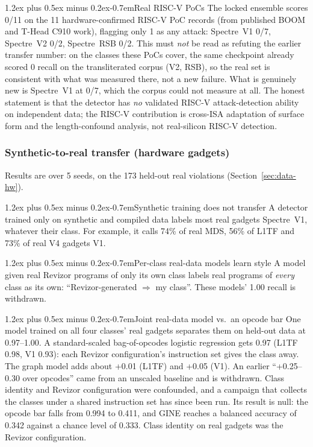 \documentclass[conference]{IEEEtran}
\makeatletter
\renewcommand\paragraph{\@startsection{paragraph}{4}{\z@}%
  {1.2ex plus 0.5ex minus 0.2ex}{-0.7em}{\normalfont\normalsize\bfseries}}
\makeatother
\begin{document}
\paragraph{Real RISC-V PoCs}
The locked ensemble scores 0/11 on the 11 hardware-confirmed RISC-V PoC
records (from published BOOM and T-Head C910 work), flagging only 1 as any
attack: Spectre~V1 0/7, Spectre~V2 0/2, Spectre~RSB 0/2. This must \emph{not}
be read as refuting the earlier transfer number: on the classes these PoCs
cover, the same checkpoint already scored 0 recall on the transliterated
corpus (V2, RSB), so the real set is consistent with what was measured there,
not a new failure. What is genuinely new is Spectre~V1 at 0/7, which the
corpus could not measure at all. The honest statement is that the detector has
\emph{no} validated RISC-V attack-detection ability on independent data; the
RISC-V contribution is cross-ISA adaptation of surface form and the length-confound
analysis, not real-silicon RISC-V detection.

\subsubsection{Synthetic-to-real transfer (hardware gadgets)}
\label{sec:hw-transfer}
Results are over 5 seeds, on the 173 held-out real violations
(Section~\ref{sec:data-hw}).

\paragraph{Synthetic training does not transfer}
A detector trained only on synthetic and compiled data labels most real
gadgets Spectre~V1, whatever their class. For example, it calls 74\% of real
MDS, 56\% of L1TF and 73\% of real V4 gadgets V1.

\paragraph{Per-class real-data models learn style}
A model given real Revizor programs of only its own class labels real programs
of \emph{every} class as its own: ``Revizor-generated $\Rightarrow$ my class''.
These models' 1.00 recall is withdrawn.

\paragraph{Joint real-data model vs.\ an opcode bar}
One model trained on all four classes' real gadgets separates them on held-out
data at 0.97--1.00. A standard-scaled bag-of-opcodes logistic regression gets
0.97 (L1TF 0.98, V1 0.93): each Revizor configuration's instruction set gives
the class away. The graph model adds about +0.01 (L1TF) and +0.05 (V1). An
earlier ``+0.25--0.30 over opcodes'' came from an unscaled baseline and is
withdrawn. Class identity and Revizor configuration were confounded, and a
campaign that collects the classes under a shared instruction set has since
been run. Its result is null: the opcode bar falls from 0.994 to 0.411, and
GINE reaches a balanced accuracy of 0.342 against a chance level of 0.333.
Class identity on real gadgets was the Revizor configuration.
\end{document}
